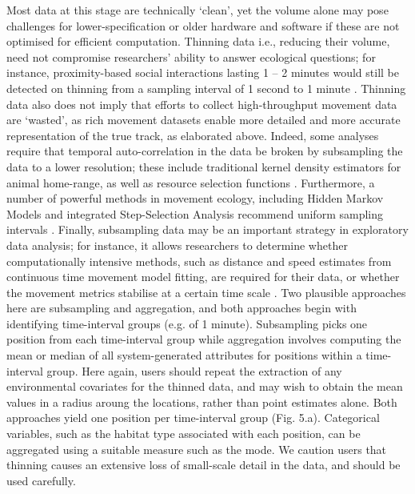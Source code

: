 \begin{refsection}[sorting=nyt]
    Most data at this stage are technically ‘clean’, yet the volume alone may pose challenges for lower-specification or older hardware and software if these are not optimised for efficient computation.
    Thinning data i.e., reducing their volume, need not compromise researchers' ability to answer ecological questions; for instance, proximity-based social interactions lasting 1 -- 2 minutes would still be detected on thinning from a sampling interval of 1 second to 1 minute \citep[][]{aspillaga2021a}.
    Thinning data also does not imply that efforts to collect high-throughput movement data are ‘wasted’, as rich movement datasets enable more detailed and more accurate representation of the true track, as elaborated above. 
    Indeed, some analyses require that temporal auto-correlation in the data be broken by subsampling the data to a lower resolution; these include traditional kernel density estimators for animal home-range, as well as resource selection functions \citep{fleming2014a,manly2007,dupke2017}.
    Furthermore, a number of powerful methods in movement ecology, including Hidden Markov Models and integrated Step-Selection Analysis recommend uniform sampling intervals \citep{avgar2016,langrock2012,michelot2016}.
    Finally, subsampling data may be an important strategy in exploratory data analysis; for instance, it allows researchers to determine whether computationally intensive methods, such as distance and speed estimates from continuous time movement model fitting, are required for their data, or whether the movement metrics stabilise at a certain time scale \citep[][]{noonan2019}.
    Two plausible approaches here are subsampling and aggregation, and both approaches begin with identifying time-interval groups (e.g. of 1 minute).
    Subsampling picks one position from each time-interval group while aggregation involves computing the mean or median of all system-generated attributes for positions within a time-interval group.
    Here again, users should repeat the extraction of any environmental covariates for the thinned data, and may wish to obtain the mean values in a radius aroung the locations, rather than point estimates alone.
    Both approaches yield one position per time-interval group (Fig. 5.a).
    Categorical variables, such as the habitat type associated with each position, can be aggregated using a suitable measure such as the mode.
    We caution users that thinning causes an extensive loss of small-scale detail in the data, and should be used carefully.


\end{refsection}
